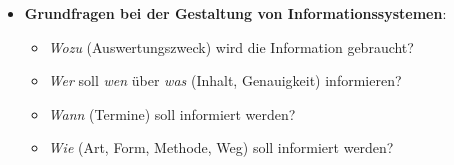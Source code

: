 \documentclass[12pt,a4paper]{article}
\begin{document}
\begin{itemize}
   \item \textbf{Grundfragen bei der Gestaltung von Informationssystemen}:
      \begin{itemize}
         \item \textit{Wozu} (Auswertungszweck) wird die Information gebraucht?
         \item \textit{Wer} soll \textit{wen} über \textit{was} (Inhalt, Genauigkeit) informieren?
         \item \textit{Wann} (Termine) soll informiert werden?
         \item \textit{Wie} (Art, Form, Methode, Weg) soll informiert werden?
      \end{itemize}
\end{itemize}
\end{document}
